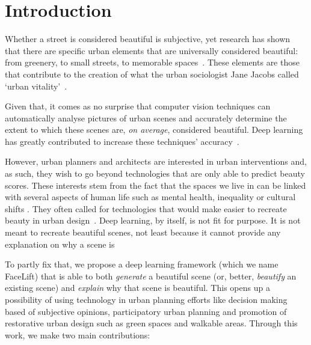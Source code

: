 \section{Introduction}


Whether a street is considered beautiful is subjective, yet research has shown that there are specific urban elements that are universally considered beautiful: from greenery, to small streets, to memorable spaces~\cite{alexander1977pattern, quercia2014aesthetic,salesses2013collaborative}. These elements are those that contribute to the creation of what the urban sociologist Jane Jacobs called `urban vitality'~\cite{jacobs1961death}. 


Given that, it comes as no surprise that computer vision techniques can automatically analyse pictures of urban scenes and accurately determine the extent to which these scenes are, \emph{on average}, considered beautiful.  Deep learning has greatly contributed to increase these techniques' accuracy~\cite{dubey2016deep}.

However, urban planners and architects are interested in urban interventions and, as such, they wish to go beyond technologies that are only able to predict beauty scores. These interests stem from the fact that the spaces we live in can be linked with several aspects of human life such as mental health\cite{seresinhe2015quantifying}, inequality \cite{salesses2013collaborative} or cultural shifts \cite{10.3389/fphy.2018.00027}. They often called for technologies that would make easier to recreate beauty in urban design~\cite{de2008architecture}. Deep learning, by itself, is not fit for purpose. It is not meant to recreate beautiful scenes, not least because it cannot provide any explanation on why a scene is 


To partly fix that, we propose a deep learning framework (which we name  FaceLift) that is able to both \emph{generate} a beautiful scene (or, better, \emph{beautify} an existing scene) and \emph{explain} why that scene is beautiful. This opens up a possibility of using technology in urban planning efforts like decision making based of subjective opinions, participatory urban planning and promotion of restorative urban design such as green spaces and walkable areas.  Through this work, we make two main contributions:


